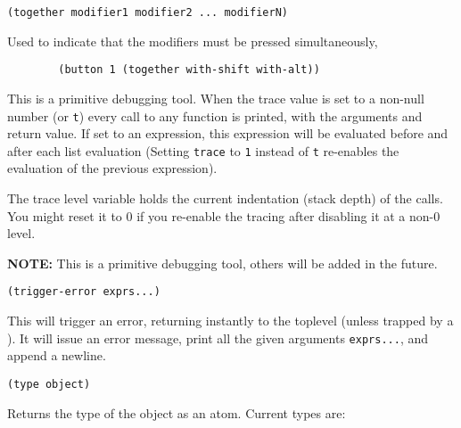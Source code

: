         
{\usagefont\begin{verbatim}
(together modifier1 modifier2 ... modifierN)
\end{verbatim}}\usageupspace

Used to indicate that the modifiers must be pressed simultaneously, 

{\exemplefont\begin{verbatim}
        (button 1 (together with-shift with-alt))
\end{verbatim}}

        

This is a primitive debugging tool. When the trace value is set to a non-null
number (or \verb"t") every call to any {\WOOL} function is printed,
with the arguments and return value.  If set to an expression, this expression
will be evaluated before and after each list evaluation (Setting
\verb"trace" to \verb"1" instead of \verb"t" re-enables the evaluation of
the previous expression).

The trace level variable holds the
current indentation (stack depth) of the calls.  You might reset it to 0 if
you re-enable the tracing after disabling it at a non-0 level.

{\bf NOTE:} This is a primitive debugging tool, others will be added
in the future.

        
{\usagefont\begin{verbatim}
(trigger-error exprs...)
\end{verbatim}}\usageupspace

This will trigger an error, returning instantly to the toplevel (unless trapped
by a ). It will issue an error message, 
print all the given arguments \verb"exprs...", and append a newline.

        
{\usagefont\begin{verbatim}
(type object)
\end{verbatim}}\usageupspace

Returns the {\WOOL} type of the object as an atom. Current types are:

